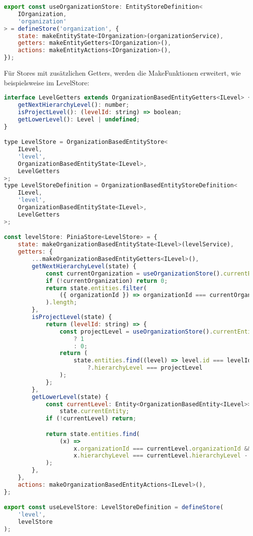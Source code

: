 \begin{lstlisting}[language=JavaScript, caption=Implementierung des OrganizationStores]
export const useOrganizationStore: EntityStoreDefinition<
    IOrganization,
    'organization'
> = defineStore('organization', {
    state: makeEntityState<IOrganization>(organizationService),
    getters: makeEntityGetters<IOrganization>(),
    actions: makeEntityActions<IOrganization>(),
});
\end{lstlisting}

Für Stores mit zusätzlichen Getters, werden die MakeFunktionen erweitert, wie beispielsweise im LevelStore:

\begin{lstlisting}[language=JavaScript, caption=Implementierung des LevelStores]
interface LevelGetters extends OrganizationBasedEntityGetters<ILevel> {
    getNextHierarchyLevel(): number;
    isProjectLevel(): (levelId: string) => boolean;
    getLowerLevel(): Level | undefined;
}

type LevelStore = OrganizationBasedEntityStore<
    ILevel,
    'level',
    OrganizationBasedEntityState<ILevel>,
    LevelGetters
>;
type LevelStoreDefinition = OrganizationBasedEntityStoreDefinition<
    ILevel,
    'level',
    OrganizationBasedEntityState<ILevel>,
    LevelGetters
>;

const levelStore: PiniaStore<LevelStore> = {
    state: makeOrganizationBasedEntityState<ILevel>(levelService),
    getters: {
        ...makeOrganizationBasedEntityGetters<ILevel>(),
        getNextHierarchyLevel(state) {
            const currentOrganization = useOrganizationStore().currentEntity;
            if (!currentOrganization) return 0;
            return state.entities.filter(
                ({ organizationId }) => organizationId === currentOrganization.id
            ).length;
        },
        isProjectLevel(state) {
            return (levelId: string) => {
                const projectLevel = useOrganizationStore().currentEntity?.useEpics
                    ? 1
                    : 0;
                return (
                    state.entities.find((level) => level.id === levelId)
                        ?.hierarchyLevel === projectLevel
                );
            };
        },
        getLowerLevel(state) {
            const currentLevel: Entity<OrganizationBasedEntity<ILevel>> =
                state.currentEntity;
            if (!currentLevel) return;

            return state.entities.find(
                (x) =>
                    x.organizationId === currentLevel.organizationId &&
                    x.hierarchyLevel === currentLevel.hierarchyLevel - 1
            );
        },
    },
    actions: makeOrganizationBasedEntityActions<ILevel>(),
};

export const useLevelStore: LevelStoreDefinition = defineStore(
    'level',
    levelStore
);
\end{lstlisting}


